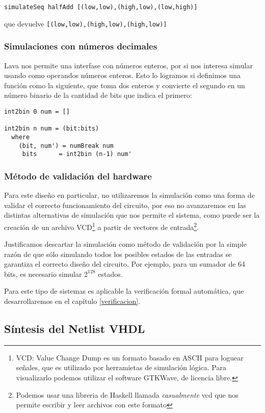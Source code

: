 {\footnotesize
\begin{verbatim} 
simulateSeq halfAdd [(low,low),(high,low),(low,high)]
\end{verbatim}
}

\noindent que devuelve {\footnotesize\verb|[(low,low),(high,low),(high,low)]|}

\subsubsection{Simulaciones con números decimales}
Lava nos permite una interfase con números enteros, por si nos interesa simular usando como operandos números enteros. Esto lo logramos si definimos una función como la siguiente, que toma dos enteros y convierte el segundo en un número binario de la cantidad de bits que indica el primero:
\begin{lstlisting}
int2bin 0 num = []

int2bin n num = (bit:bits)
  where
    (bit, num') = numBreak num
     bits      = int2bin (n-1) num'
\end{lstlisting}

\subsubsection{Método de validación del hardware}
Para este diseño en particular, no utilizaremos la simulación como una forma de validar el correcto funcionamiento del circuito, por eso no avanzaremos en las distintas alternativas de simulación que nos permite el sistema, como puede ser la creación de un archivo VCD\footnote{VCD: Value Change Dump es un formato basado en ASCII para loguear señales, que es utilizado por herramietas de simulación lógica. Para visualizarlo podemos utilizar el software GTKWave, de licencia libre.} a partir de vectores de entrada\footnote{Podemos usar una libreria de Haskell llamada \emph{casualmente} vcd que nos permite escribir y leer archivos con este formato}.

Justificamos descartar la simulación como método de validación por la simple razón de que sólo simulando todos los posibles estados de las entradas se garantiza el correcto diseño del circuito. Por ejemplo, para un sumador de 64 bits, es necesario simular $2^{128}$ estados.

Para este tipo de sistemas es aplicable la verificación formal automática, que desarrollaremos en el capítulo \ref{verificacion}.

\subsection{Síntesis del Netlist VHDL}

